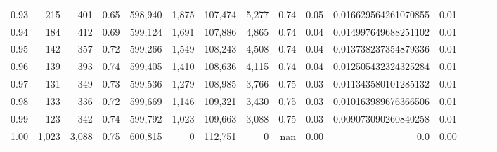 \begin{tabular}{rrrrrrrrrrrrrrr}
0.93 &     215 &    401 &  0.65 &  598,940 &    1,875 &  107,474 &    5,277 &  0.74 &  0.05 &  0.016629564261070855 &      0.01 \\
0.94 &     184 &    412 &  0.69 &  599,124 &    1,691 &  107,886 &    4,865 &  0.74 &  0.04 &  0.014997649688251102 &      0.01 \\
0.95 &     142 &    357 &  0.72 &  599,266 &    1,549 &  108,243 &    4,508 &  0.74 &  0.04 &  0.013738237354879336 &      0.01 \\
0.96 &     139 &    393 &  0.74 &  599,405 &    1,410 &  108,636 &    4,115 &  0.74 &  0.04 &  0.012505432324325284 &      0.01 \\
0.97 &     131 &    349 &  0.73 &  599,536 &    1,279 &  108,985 &    3,766 &  0.75 &  0.03 &  0.011343580101285132 &      0.01 \\
0.98 &     133 &    336 &  0.72 &  599,669 &    1,146 &  109,321 &    3,430 &  0.75 &  0.03 &  0.010163989676366506 &      0.01 \\
0.99 &     123 &    342 &  0.74 &  599,792 &    1,023 &  109,663 &    3,088 &  0.75 &  0.03 &  0.009073090260840258 &      0.01 \\
1.00 &   1,023 &  3,088 &  0.75 &  600,815 &        0 &  112,751 &        0 &   nan &  0.00 &                   0.0 &      0.00 \\
\bottomrule
\end{tabular}

